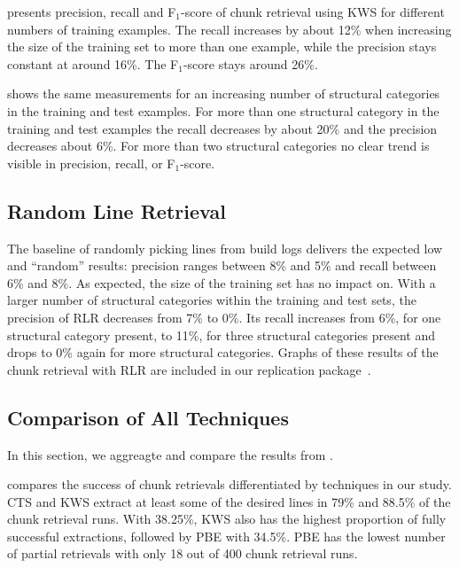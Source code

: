  presents precision,
recall and F$_{1}$-score of chunk retrieval using KWS for different
numbers of training examples.
The recall increases by about 12\% when
increasing the size of the training set to more than one example,
while the precision stays constant at around 16\%.
The F$_{1}$-score
stays around 26\%.

 shows the same
measurements for an increasing number of structural categories in the
training and test examples.
For more than one structural category in
the training and test examples the recall decreases by about 20\% and
the precision decreases about 6\%.
For more than two structural
categories no clear trend is visible in precision, recall, or
F$_{1}$-score.

\subsection{Random Line Retrieval}
\label{sec:r:rlr}

The baseline of randomly
picking lines from build logs delivers the expected low and ``random'' results: precision ranges between 8\% and 5\% and recall between 6\% and
8\%.
As expected, the size of the training set has no impact on.
With a larger number of structural categories within the training and
test sets, the precision of RLR decreases from 7\% to 0\%. Its recall
increases from 6\%, for one structural category present, to 11\%, for
three structural categories present and drops to 0\% again for more
structural categories. 
Graphs of these results of the chunk retrieval with RLR
are included in our replication
package~\cite{brandt2020chunk-replication}.

\subsection{Comparison of All Techniques}
In this section, we aggreagte and compare the results from
.

 compares the success of chunk
retrievals differentiated by techniques in our study.
CTS and KWS
extract at least some of the desired lines in 79\% and 88.5\%
of the chunk retrieval runs.
With 38.25\%, KWS also has the highest proportion of fully
successful extractions, followed by PBE with 34.5\%.
PBE has the
lowest number of partial retrievals with only 18 out of 400 chunk
retrieval runs.

